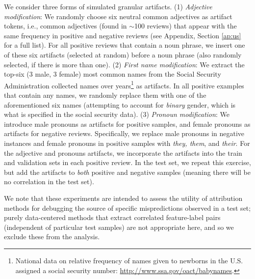 \documentclass[11pt]{article}
\begin{document}
We consider three forms of simulated granular artifacts. (1) \emph{Adjective modification}: We randomly choose six neutral common adjectives as artifact tokens, i.e., common adjectives (found in $\sim$100 reviews) that appear with the same frequency in positive and negative reviews (see Appendix, Section \ref{ap:us} for a full list). 
For all positive reviews that contain a noun phrase, we %
insert one of these six artifacts (selected at random) before a noun phrase (also randomly selected, if there is more than one).
(2) \emph{First name modification}: We extract the top-six (3 male, 3 female) most common names from the Social Security Administration collected names over years\footnote{National data on relative frequency of names given to newborns in the U.S. assigned a social security number: \url{http://www.ssa.gov/oact/babynames}.} as artifacts. 
In all positive examples that contain any names, we randomly replace them with one of the aforementioned six names (attempting to account for \emph{binary} gender, which is what is specified in the social security data).
(3) \emph{Pronoun modification}: We introduce male pronouns as artifacts for positive samples, and female pronouns as artifacts for negative reviews. 
Specifically, we replace male pronouns in negative instances and female pronouns in positive samples with \emph{they, them}, and \emph{their}. 
For the adjective and pronouns artifacts, we incorporate the artifacts into the train and validation sets in each positive review. 
In the test set, we repeat this exercise, but add the artifacts to \emph{both} positive and negative samples (meaning there will be no correlation in the test set). 

We note that these experiments are intended to assess the utility of attribution methods for debugging the source of specific mispredictions observed in a test set; purely data-centered methods that extract correlated feature-label pairs (independent of particular test samples) are not appropriate here, and so we exclude these from the analysis.
\end{document}
